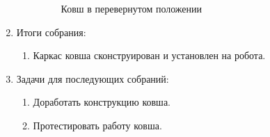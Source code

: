 \begin{enumerate}
\begin{enumerate}
\begin{figure}[H]
\begin{minipage}[h]{0.47\linewidth}
				\caption{Ковш в перевернутом положении}
			\end{minipage}
		\end{figure}
		
	\end{enumerate}
	
	\item Итоги собрания:
	\begin{enumerate}
		\item Каркас ковша сконструирован и установлен на робота.
		
	\end{enumerate}
	
	\item Задачи для последующих собраний:
	\begin{enumerate}
		\item Доработать конструкцию ковша.
		
		\item Протестировать работу ковша.
		
	\end{enumerate}     
\end{enumerate}
\fillpage

